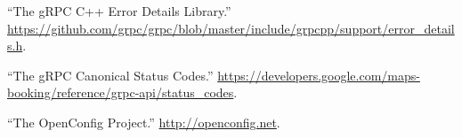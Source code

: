 \documentclass[11pt]{article}
\begin{document}
{{\begin{thebibliography}{36}
\mdbibitemlabel{{}[31]}\textquotedblleft{}The gRPC C++ Error Details Library.\textquotedblright{} \href{https://github.com/grpc/grpc/blob/master/include/grpcpp/support/error_details.h}{{\ttfamily https://\hspace{0pt}github.\hspace{0pt}com/\hspace{0pt}grpc/\hspace{0pt}grpc/\hspace{0pt}blob/\hspace{0pt}master/\hspace{0pt}include/\hspace{0pt}grpcpp/\hspace{0pt}support/\hspace{0pt}error\_\hspace{0pt}details.\hspace{0pt}h}}.\label{grpcerrordetails}%

\mdbibitemlabel{{}[32]}\textquotedblleft{}The gRPC Canonical Status Codes.\textquotedblright{} \href{https://developers.google.com/maps-booking/reference/grpc-api/status_codes}{{\ttfamily https://\hspace{0pt}developers.\hspace{0pt}google.\hspace{0pt}com/\hspace{0pt}maps-\hspace{0pt}booking/\hspace{0pt}reference/\hspace{0pt}grpc-\hspace{0pt}api/\hspace{0pt}status\_\hspace{0pt}codes}}.\label{grpcstatuscodes}%

\mdbibitemlabel{{}[33]}\textquotedblleft{}The OpenConfig Project.\textquotedblright{} \href{http://openconfig.net}{{\ttfamily http://\hspace{0pt}openconfig.\hspace{0pt}net}}.\label{openconfig}%


\end{thebibliography}}}
\end{document}
